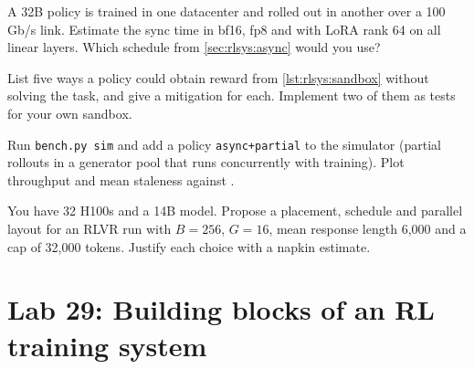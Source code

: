 \begin{exercise}
A 32B policy is trained in one datacenter and rolled out in another over a 100\,Gb/s link.
Estimate the sync time in bf16, fp8 and with LoRA rank 64 on all linear layers. Which
schedule from \cref{sec:rlsys:async} would you use?
\end{exercise}

\begin{exercise}
List five ways a policy could obtain reward from \cref{lst:rlsys:sandbox} without solving the
task, and give a mitigation for each. Implement two of them as tests for your own sandbox.
\end{exercise}

\begin{exercise}[Measurement]
Run \texttt{bench.py sim} and add a policy \texttt{async+partial} to the simulator (partial
rollouts in a generator pool that runs concurrently with training). Plot throughput and
mean staleness against .
\end{exercise}

\begin{exercise}[Design]
You have 32 H100s and a 14B model. Propose a placement, schedule and parallel layout for an
RLVR run with $B=256$, $G=16$, mean response length 6{,}000 and a cap of 32{,}000 tokens.
Justify each choice with a napkin estimate.
\end{exercise}

\section{Lab 29: Building blocks of an RL training system}\label{sec:rlsys:lab}

